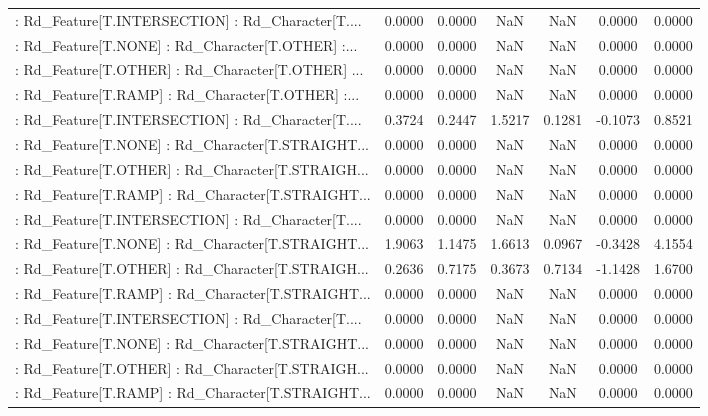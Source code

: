 \begin{longtable}{p{4cm}cccccc}
 : Rd\_Feature[T.INTERSECTION] : Rd\_Character[T.... &  0.0000 &    0.0000 &     NaN &          NaN &  0.0000 &  0.0000 \\
 : Rd\_Feature[T.NONE] : Rd\_Character[T.OTHER] :... &  0.0000 &    0.0000 &     NaN &          NaN &  0.0000 &  0.0000 \\
 : Rd\_Feature[T.OTHER] : Rd\_Character[T.OTHER] ... &  0.0000 &    0.0000 &     NaN &          NaN &  0.0000 &  0.0000 \\
 : Rd\_Feature[T.RAMP] : Rd\_Character[T.OTHER] :... &  0.0000 &    0.0000 &     NaN &          NaN &  0.0000 &  0.0000 \\
 : Rd\_Feature[T.INTERSECTION] : Rd\_Character[T.... &  0.3724 &    0.2447 &  1.5217 &       0.1281 & -0.1073 &  0.8521 \\
 : Rd\_Feature[T.NONE] : Rd\_Character[T.STRAIGHT... &  0.0000 &    0.0000 &     NaN &          NaN &  0.0000 &  0.0000 \\
 : Rd\_Feature[T.OTHER] : Rd\_Character[T.STRAIGH... &  0.0000 &    0.0000 &     NaN &          NaN &  0.0000 &  0.0000 \\
 : Rd\_Feature[T.RAMP] : Rd\_Character[T.STRAIGHT... &  0.0000 &    0.0000 &     NaN &          NaN &  0.0000 &  0.0000 \\
 : Rd\_Feature[T.INTERSECTION] : Rd\_Character[T.... &  0.0000 &    0.0000 &     NaN &          NaN &  0.0000 &  0.0000 \\
 : Rd\_Feature[T.NONE] : Rd\_Character[T.STRAIGHT... &  1.9063 &    1.1475 &  1.6613 &       0.0967 & -0.3428 &  4.1554 \\
 : Rd\_Feature[T.OTHER] : Rd\_Character[T.STRAIGH... &  0.2636 &    0.7175 &  0.3673 &       0.7134 & -1.1428 &  1.6700 \\
 : Rd\_Feature[T.RAMP] : Rd\_Character[T.STRAIGHT... &  0.0000 &    0.0000 &     NaN &          NaN &  0.0000 &  0.0000 \\
 : Rd\_Feature[T.INTERSECTION] : Rd\_Character[T.... &  0.0000 &    0.0000 &     NaN &          NaN &  0.0000 &  0.0000 \\
 : Rd\_Feature[T.NONE] : Rd\_Character[T.STRAIGHT... &  0.0000 &    0.0000 &     NaN &          NaN &  0.0000 &  0.0000 \\
 : Rd\_Feature[T.OTHER] : Rd\_Character[T.STRAIGH... &  0.0000 &    0.0000 &     NaN &          NaN &  0.0000 &  0.0000 \\
 : Rd\_Feature[T.RAMP] : Rd\_Character[T.STRAIGHT... &  0.0000 &    0.0000 &     NaN &          NaN &  0.0000 &  0.0000 \\

\end{longtable}

